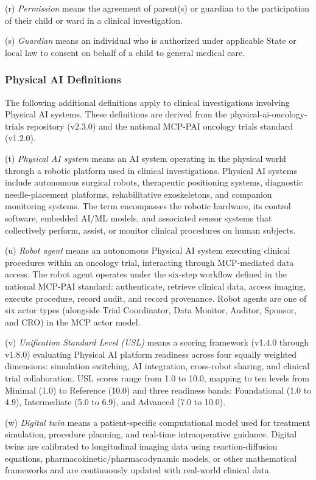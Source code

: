 \documentclass[11pt]{article}
\begin{document}
(r) \textit{Permission} means the agreement of parent(s) or guardian to the participation of their child or ward in a clinical investigation.

(s) \textit{Guardian} means an individual who is authorized under applicable State or local law to consent on behalf of a child to general medical care.

\subsubsection{Physical AI Definitions}

The following additional definitions apply to clinical investigations involving Physical AI systems. These definitions are derived from the physical-ai-oncology-trials repository (v2.3.0) and the national MCP-PAI oncology trials standard (v1.2.0).

(t) \textit{Physical AI system} means an AI system operating in the physical world through a robotic platform used in clinical investigations. Physical AI systems include autonomous surgical robots, therapeutic positioning systems, diagnostic needle-placement platforms, rehabilitative exoskeletons, and companion monitoring systems. The term encompasses the robotic hardware, its control software, embedded AI/ML models, and associated sensor systems that collectively perform, assist, or monitor clinical procedures on human subjects.

(u) \textit{Robot agent} means an autonomous Physical AI system executing clinical procedures within an oncology trial, interacting through MCP-mediated data access. The robot agent operates under the six-step workflow defined in the national MCP-PAI standard: authenticate, retrieve clinical data, access imaging, execute procedure, record audit, and record provenance. Robot agents are one of six actor types (alongside Trial Coordinator, Data Monitor, Auditor, Sponsor, and CRO) in the MCP actor model.

(v) \textit{Unification Standard Level (USL)} means a scoring framework (v1.4.0 through v1.8.0) evaluating Physical AI platform readiness across four equally weighted dimensions: simulation switching, AI integration, cross-robot sharing, and clinical trial collaboration. USL scores range from 1.0 to 10.0, mapping to ten levels from Minimal (1.0) to Reference (10.0) and three readiness bands: Foundational (1.0 to 4.9), Intermediate (5.0 to 6.9), and Advanced (7.0 to 10.0).

(w) \textit{Digital twin} means a patient-specific computational model used for treatment simulation, procedure planning, and real-time intraoperative guidance. Digital twins are calibrated to longitudinal imaging data using reaction-diffusion equations, pharmacokinetic/pharmacodynamic models, or other mathematical frameworks and are continuously updated with real-world clinical data.
\end{document}
